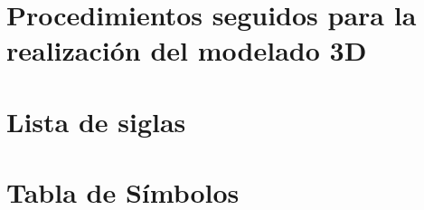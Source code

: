 \chapter[Procedimientos del modelado 3D]{Procedimientos seguidos para la realización del modelado 3D}\label{ch:procedimientosModelado3D}
\chapter{Lista de siglas}

\glsaddall
\setlength{\glsdescwidth}{\textwidth}
\printglossary[type=\acronymtype,title=Acr\'{o}nimos,style=longheader]%
\let\cleardoublepage\clearpage
\chapter{Tabla de Símbolos}
\setlength{\glsdescwidth}{15cm}
\printglossary[type=symbolslist,style=symbunitlong]
\let\cleardoublepage\clearpage
